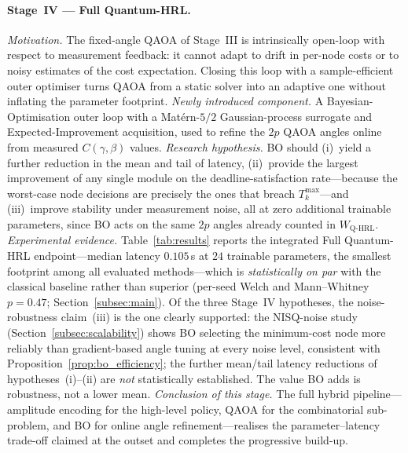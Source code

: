 \documentclass[11pt,a4paper]{article}
\theoremstyle{definition}
\begin{document}
\paragraph{Stage~IV --- Full Quantum-HRL.}
\emph{Motivation.} The fixed-angle QAOA of Stage~III is intrinsically open-loop with respect to measurement feedback: it cannot adapt to drift in per-node costs or to noisy estimates of the cost expectation. Closing this loop with a sample-efficient outer optimiser turns QAOA from a static solver into an adaptive one without inflating the parameter footprint.
\emph{Newly introduced component.} A Bayesian-Optimisation outer loop with a Mat\'ern-$5/2$ Gaussian-process surrogate and Expected-Improvement acquisition, used to refine the $2p$ QAOA angles online from measured $C(\gamma,\beta)$ values.
\emph{Research hypothesis.} BO should (i)~yield a further reduction in the mean and tail of latency, (ii)~provide the largest improvement of any single module on the deadline-satisfaction rate---because the worst-case node decisions are precisely the ones that breach $T_k^{\max}$---and (iii)~improve stability under measurement noise, all at zero additional trainable parameters, since BO acts on the same $2p$ angles already counted in $W_{\mathrm{Q\text{-}HRL}}$.
\emph{Experimental evidence.} Table~\ref{tab:results} reports the integrated Full Quantum-HRL endpoint---median latency $0.105$\,s at $24$ trainable parameters, the smallest footprint among all evaluated methods---which is \emph{statistically on par} with the classical baseline rather than superior (per-seed Welch and Mann--Whitney $p=0.47$; Section~\ref{subsec:main}). Of the three Stage~IV hypotheses, the noise-robustness claim~(iii) is the one clearly supported: the NISQ-noise study (Section~\ref{subsec:scalability}) shows BO selecting the minimum-cost node more reliably than gradient-based angle tuning at every noise level, consistent with Proposition~\ref{prop:bo_efficiency}; the further mean/tail latency reductions of hypotheses~(i)--(ii) are \emph{not} statistically established. The value BO adds is robustness, not a lower mean.
\emph{Conclusion of this stage.} The full hybrid pipeline---amplitude encoding for the high-level policy, QAOA for the combinatorial sub-problem, and BO for online angle refinement---realises the parameter--latency trade-off claimed at the outset and completes the progressive build-up.
\end{document}
